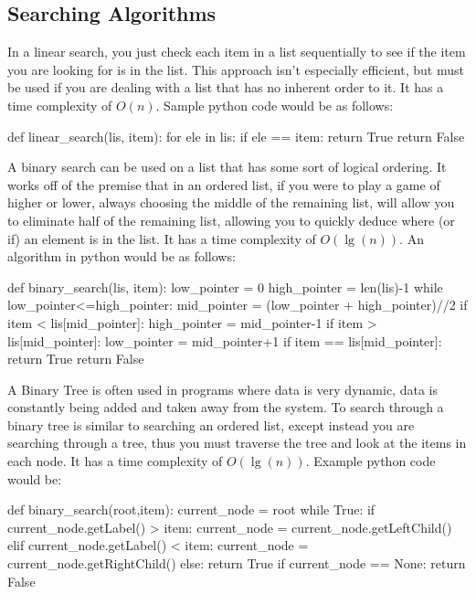 \subsection{Searching Algorithms}
  \noindent
	  In a linear search, you just check each item in a list sequentially to see if the item you are looking for is in the list. This approach isn't especially efficient, but must be used if you are dealing with a list that has no inherent order to it. It has a time complexity of $O(n)$. Sample python code would be as follows:
	  
\begin{python}
def linear_search(lis, item):
	for ele in lis:
		if ele == item:
			return True
	return False
\end{python}

  \noindent
  A binary search can be used on a list that has some sort of logical ordering. It works off of the premise that in an ordered list, if you were to play a game of higher or lower, always choosing the middle of the remaining list, will allow you to eliminate half of the remaining list, allowing you to quickly deduce where (or if) an element is in the list. It has a time complexity of $O(\lg(n))$. An algorithm in python would be as follows:

\begin{python}
def binary_search(lis, item):
	low_pointer = 0
	high_pointer = len(lis)-1
	while low_pointer<=high_pointer:
		mid_pointer = (low_pointer + high_pointer)//2
		if item < lis[mid_pointer]:
			high_pointer = mid_pointer-1
		if item > lis[mid_pointer]:
			low_pointer = mid_pointer+1
		if item == lis[mid_pointer]:
			return True
	return False
\end{python}

  \noindent
  A Binary Tree is often used in programs where data is very dynamic, data is constantly being added and taken away from the system. To search through a binary tree is similar to searching an ordered list, except instead you are searching through a tree, thus you must traverse the tree and look at the items in each node. It has a time complexity of $O(\lg(n))$. Example python code would be:
  
\begin{python}
def binary_search(root,item):
	current_node = root
	while True:
		if current_node.getLabel() > item:
			current_node = current_node.getLeftChild()
		elif current_node.getLabel() < item:
			current_node = current_node.getRightChild()
		else:
			return True
		if current_node == None:
			return False
\end{python} 

